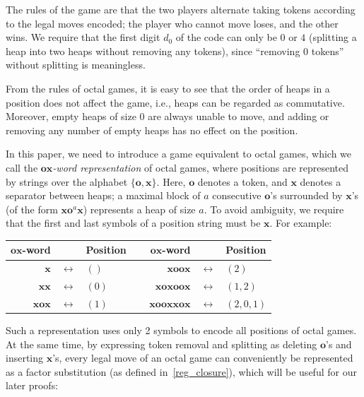 \documentclass[11pt]{article}
\theoremstyle{definition}
\theoremstyle{plain}
\newcommand{\x}{\mathbf{x}}
\newcommand{\e}{\mathbf{o}}
\begin{document}
The rules of the game are that the two players alternate taking tokens according to the legal moves encoded; the player who cannot move loses, and the other wins.
We require that the first digit $d_0$ of the code can only be $0$ or $4$ (splitting a heap into two heaps without removing any tokens), since ``removing $0$ tokens'' without splitting is meaningless.

From the rules of octal games, it is easy to see that the order of heaps in a position does not affect the game, i.e., heaps can be regarded as commutative.
Moreover, empty heaps of size $0$ are always unable to move, and adding or removing any number of empty heaps has no effect on the position.

In this paper, we need to introduce a game equivalent to octal games, which we call the \textit{$\e\x$-word representation} of octal games, where positions are represented by strings over the alphabet $\{\e, \x\}$.
Here, $\e$ denotes a token, and $\x$ denotes a separator between heaps; a maximal block of $a$ consecutive $\e$'s surrounded by $\x$'s (of the form $\x\e^a \x$) represents a heap of size $a$.
To avoid ambiguity, we require that the first and last symbols of a position string must be $\x$.
For example:

\begin{center}
    \begin{tabular}{|rcl|rcl|}
        \hline
        $\e\x$-word & & Position & $\e\x$-word & & Position \\
        \hline
        $\x$     & $\leftrightarrow$ & $()$  ~~&~~ $\x\e\e\x$       & $\leftrightarrow$ & $(2)$ \\
        $\x\x$   & $\leftrightarrow$ & $(0)$ ~~&~~ $\x\e\x\e\e\x$   & $\leftrightarrow$ & $(1, 2)$ \\
        $\x\e\x$ & $\leftrightarrow$ & $(1)$ ~~&~~ $\x\e\e\x\x\e\x$ & $\leftrightarrow$ & $(2, 0, 1)$ \\
        \hline
    \end{tabular}
\end{center}

Such a representation uses only 2 symbols to encode all positions of octal games.
At the same time, by expressing token removal and splitting as deleting $\e$'s and inserting $\x$'s, every legal move of an octal game can conveniently be represented as a factor substitution (as defined in~\ref{reg_closure}),
which will be useful for our later proofs:
\end{document}
